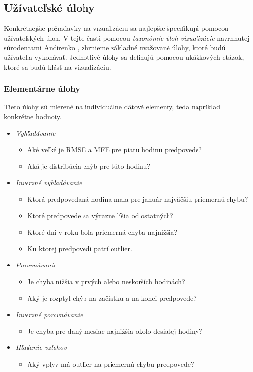 \subsection{Užívateľské úlohy}
Konkrétnejšie požiadavky na vizualizáciu sa najlepšie špecifikujú pomocou užívateľských úloh. V tejto časti pomocou \textit{taxonómie úloh vizualizácie} navrhnutej súrodencami Andirenko \cite{Andrienko}, zhrnieme základné uvažované úlohy, ktoré budú užívatelia vykonávať. Jednotlivé úlohy sa definujú pomocou ukážkových otázok, ktoré sa budú klásť na vizualizáciu.
\subsubsection{Elementárne úlohy}
Tieto úlohy sú mierené na individuálne dátové elementy, teda napríklad konkrétne hodnoty.
\begin{itemize}[noitemsep]
	\item \textit{Vyhľadávanie}
	\begin{itemize}
		\item Aké veľké je RMSE a MFE pre piatu hodinu predpovede?
		\item Aká je distribúcia chýb pre túto hodinu?	 
	\end{itemize}
	\item \textit{Inverzné vyhľadávanie} 
	\begin{itemize}
		\item Ktorá predpovedaná hodina mala pre január najväčšiu priemernú chybu? 
		\item Ktoré predpovede sa výrazne líšia od ostatných? 
		\item Ktoré dni v roku bola priemerná chyba najnižšia?
		\item Ku ktorej predpovedi patrí outlier.
	\end{itemize}
	\item \textit{Porovnávanie}
	\begin{itemize}
		\item Je chyba nižšia v prvých alebo neskorších hodinách?
		\item Aký je rozptyl chýb na začiatku a na konci predpovede?
	\end{itemize}
	\item \textit{Inverzné porovnávanie}
	\begin{itemize}
		\item Je chyba pre daný mesiac najnižšia okolo desiatej hodiny?
	\end{itemize}
	\item \textit{Hľadanie vzťahov}
	\begin{itemize}
		\item Aký vplyv má outlier na priemernú chybu predpovede?
	\end{itemize}
\end{itemize}

